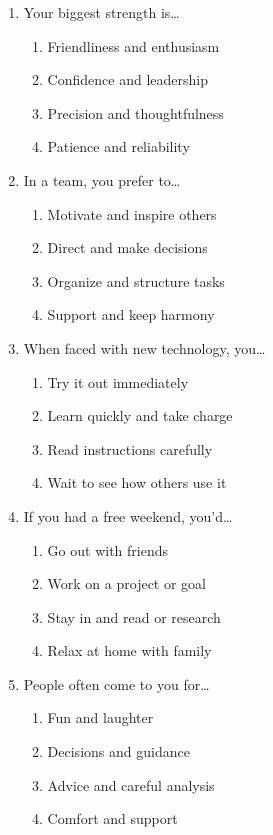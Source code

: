\documentclass[12pt]{article}
\begin{document}
\begin{enumerate}[label=\textbf{Q\arabic*.}]
\item Your biggest strength is…
\begin{enumerate}[label=(\Alph*)]
\item Friendliness and enthusiasm
\item Confidence and leadership
\item Precision and thoughtfulness
\item Patience and reliability
\end{enumerate}

\item In a team, you prefer to…
\begin{enumerate}[label=(\Alph*)]
\item Motivate and inspire others
\item Direct and make decisions
\item Organize and structure tasks
\item Support and keep harmony
\end{enumerate}

\item When faced with new technology, you…
\begin{enumerate}[label=(\Alph*)]
\item Try it out immediately
\item Learn quickly and take charge
\item Read instructions carefully
\item Wait to see how others use it
\end{enumerate}

\item If you had a free weekend, you’d…
\begin{enumerate}[label=(\Alph*)]
\item Go out with friends
\item Work on a project or goal
\item Stay in and read or research
\item Relax at home with family
\end{enumerate}

\item People often come to you for…
\begin{enumerate}[label=(\Alph*)]
\item Fun and laughter
\item Decisions and guidance
\item Advice and careful analysis
\item Comfort and support
\end{enumerate}


\end{enumerate}
\end{document}
